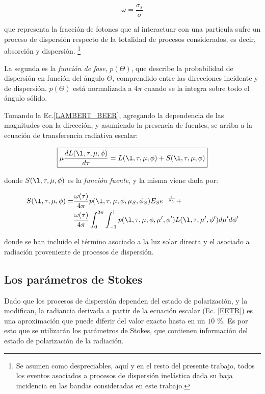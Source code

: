 \begin{equation}
 \omega=\frac{\sigma_{s}}{\sigma}
\label{lenoble2}
 \end{equation}

que representa la fracción de fotones que al interactuar con una partícula sufre un proceso de dispersión respecto de la totalidad de procesos considerados, es decir, absorción y dispersión. 
\footnote{Se asumen como despreciables, aquí y en el resto del presente trabajo, todos los eventos asociados a procesos de dispersión inelástica dada su baja incidencia en las bandas consideradas en este trabajo.}
 
La segunda es la \textit{función de fase}, $p(\Theta)$, que describe la probabilidad de dispersión en función del ángulo $\Theta$, comprendido entre las direcciones incidente y de dispersión. $p(\Theta)$ está normalizada a $4\pi$ cuando se la integra sobre todo el ángulo sólido.

Tomando la Ec.\eqref{LAMBERT_BEER}, agregando la dependencia de las magnitudes con la dirección, y asumiendo la presencia de fuentes, se arriba a la ecuación de transferencia radiativa escalar:

\begin{equation}
\boxed{\mu \frac{d L(\l,\tau,\mu,\phi)}{d\tau}=L(\l,\tau,\mu,\phi)+S(\l,\tau,\mu,\phi)}
\label{EETR}
\end{equation}

donde $S(\l,\tau,\mu,\phi)$ es la \textit{función fuente}, y la misma viene dada por:

\begin{equation}
\begin{split}
S(\l,\tau,\mu,\phi) =&\frac{\omega(\tau)}{4 \pi} 
p(\l,\tau,\mu,\phi,\mu_{S},\phi_{S}) E_{S} e^{-\frac{\tau}{\mu_{S}}} 
+\\ &\frac{\omega(\tau)}{4 \pi} \int_{0}^{2\pi} 
\int_{-1}^{1} p(\l,\tau,\mu,\phi,\mu',\phi') L(\l,\tau,\mu',\phi')d\mu'd\phi'
\end{split}
\label{fuente_escalar}
\end{equation}

donde se han incluido el término asociado a la luz solar directa y el asociado a radiación proveniente de procesos de dispersión.

\subsection{Los parámetros de Stokes}
\label{ch:marcofisico:stokes}

Dado que los procesos de dispersión dependen del estado de polarización, y la modifican, la radiancia derivada a partir de la ecuación escalar (Ec. \eqref{EETR}) es una aproximación que puede diferir del valor exacto hasta en un $10$ \%. Es por esto que se utilizarán los parámetros de Stokes, que contienen información del estado de polarización de la radiación.

